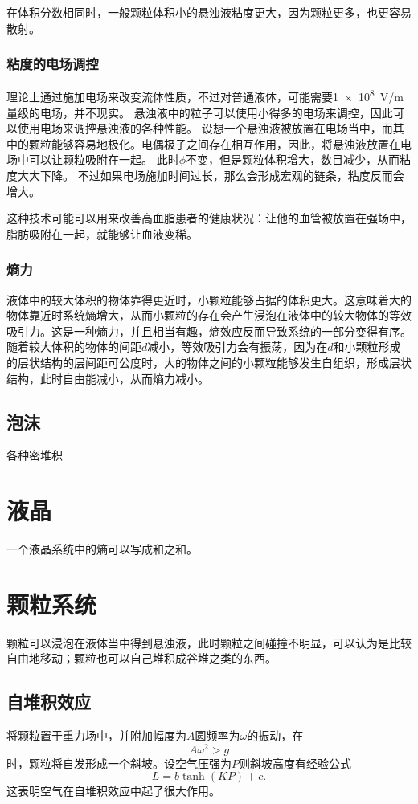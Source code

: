 在体积分数相同时，一般颗粒体积小的悬浊液粘度更大，因为颗粒更多，也更容易散射。

\subsection{粘度的电场调控}

理论上通过施加电场来改变流体性质，不过对普通液体，可能需要\SI{1e8}{V/m}量级的电场，并不现实。
悬浊液中的粒子可以使用小得多的电场来调控，因此可以使用电场来调控悬浊液的各种性能。
设想一个悬浊液被放置在电场当中，而其中的颗粒能够容易地极化。电偶极子之间存在相互作用，因此，将悬浊液放置在电场中可以让颗粒吸附在一起。
此时$\phi$不变，但是颗粒体积增大，数目减少，从而粘度大大下降。
不过如果电场施加时间过长，那么会形成宏观的链条，粘度反而会增大。

这种技术可能可以用来改善高血脂患者的健康状况：让他的血管被放置在强场中，脂肪吸附在一起，就能够让血液变稀。

\subsection{熵力}

液体中的较大体积的物体靠得更近时，小颗粒能够占据的体积更大。这意味着大的物体靠近时系统熵增大，从而小颗粒的存在会产生浸泡在液体中的较大物体的等效吸引力。这是一种熵力，并且相当有趣，熵效应反而导致系统的一部分变得有序。
随着较大体积的物体的间距$d$减小，等效吸引力会有振荡，因为在$d$和小颗粒形成的层状结构的层间距可公度时，大的物体之间的小颗粒能够发生自组织，形成层状结构，此时自由能减小，从而熵力减小。

\section{泡沫}

各种密堆积

\chapter{液晶}

一个液晶系统中的熵可以写成和之和。

\chapter{颗粒系统}

颗粒可以浸泡在液体当中得到悬浊液，此时颗粒之间碰撞不明显，可以认为是比较自由地移动；颗粒也可以自己堆积成谷堆之类的东西。

\section{自堆积效应}

将颗粒置于重力场中，并附加幅度为$A$圆频率为$\omega$的振动，在
\begin{equation}
    A \omega^2 > g
\end{equation}
时，颗粒将自发形成一个斜坡。设空气压强为$P$则斜坡高度有经验公式
\begin{equation}
    L = b \tanh(KP) + c.
\end{equation}
这表明空气在自堆积效应中起了很大作用。